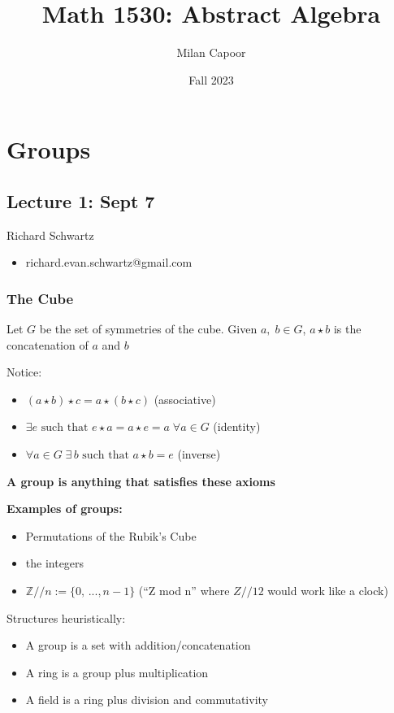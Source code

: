 \documentclass[12pt]{report}
\title{Math 1530: Abstract Algebra}
\author{Milan Capoor}
\date{Fall 2023}
\newcommand{\Z}{\mathbb{Z}}
\begin{document}
\maketitle
\chapter*{Groups}
\section*{Lecture 1: Sept 7}
Richard Schwartz
\begin{itemize}
    \item richard.evan.schwartz@gmail.com
\end{itemize}

\subsection*{The Cube}
Let $G$ be the set of symmetries of the cube. Given $a,\;b \in G$, $a \star b$ is the concatenation of $a$ and $b$

Notice:
\begin{itemize}
    \item $(a \star b) \star c = a \star (b \star c)$ (associative)
    \item $\exists e \text{ such that } e\star a = a \star e = a \; \forall a \in G$ (identity)
    \item $\forall a \in G \; \exists \, b \text{ such that } a\star b = e$ (inverse)
\end{itemize}

\textbf{A group is anything that satisfies these axioms}

\textbf{Examples of groups:}
\begin{itemize}
    \item Permutations of the Rubik's Cube
    \item the integers
    \item $\Z // n := \{0, \, ..., n -1\}$ (``Z mod n'' where $Z // 12$ would work like a clock)
\end{itemize}

Structures heuristically:
\begin{itemize}
    \item A group is a set with addition/concatenation
    \item A ring is a group plus multiplication
    \item A field is a ring plus division and commutativity
\end{itemize}
\end{document}
